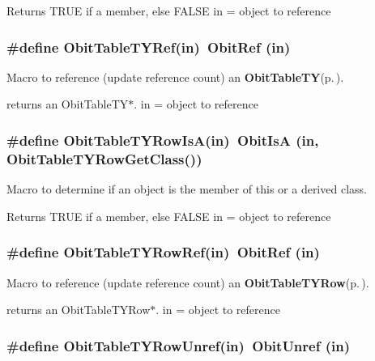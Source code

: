 Returns TRUE if a member, else FALSE in = object to reference 
\subsubsection{\setlength{\rightskip}{0pt plus 5cm}\#define Obit\-Table\-TYRef(in)\ Obit\-Ref (in)}\label{ObitTableTY_8h_a2}


Macro to reference (update reference count) an {\bf Obit\-Table\-TY}{\rm (p.\,\pageref{structObitTableTY})}. 

returns an Obit\-Table\-TY$\ast$. in = object to reference 
\subsubsection{\setlength{\rightskip}{0pt plus 5cm}\#define Obit\-Table\-TYRow\-Is\-A(in)\ Obit\-Is\-A (in, Obit\-Table\-TYRow\-Get\-Class())}\label{ObitTableTY_8h_a6}


Macro to determine if an object is the member of this or a derived class. 

Returns TRUE if a member, else FALSE in = object to reference 
\subsubsection{\setlength{\rightskip}{0pt plus 5cm}\#define Obit\-Table\-TYRow\-Ref(in)\ Obit\-Ref (in)}\label{ObitTableTY_8h_a5}


Macro to reference (update reference count) an {\bf Obit\-Table\-TYRow}{\rm (p.\,\pageref{structObitTableTYRow})}. 

returns an Obit\-Table\-TYRow$\ast$. in = object to reference 
\subsubsection{\setlength{\rightskip}{0pt plus 5cm}\#define Obit\-Table\-TYRow\-Unref(in)\ Obit\-Unref (in)}\label{ObitTableTY_8h_a4}


